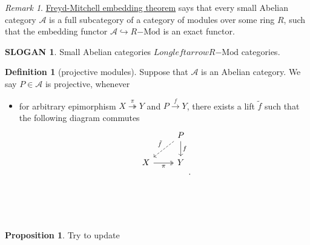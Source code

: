 \documentclass{MainStyle}
\theoremstyle{definition}
\theoremstyle{definition}
\newtheorem{slogan}{SLOGAN}
\theoremstyle{definition}
\newtheorem{definition}{Definition}
\theoremstyle{definition}
\newtheorem{proposition}{Proposition}
\theoremstyle{definition}
\theoremstyle{definition}
\theoremstyle{definition}
\theoremstyle{remark}
\newtheorem{remark}{Remark}
\theoremstyle{remark}
\begin{document}
\begin{remark}
    \href{https://ncatlab.org/nlab/show/Freyd-Mitchell+embedding+theorem}{Freyd-Mitchell embedding theorem} says that every small Abelian category $\mathcal A$ is a full subcategory of a category of modules over some ring $R$, such that the embedding functor $\mathcal A\hookrightarrow R\mathrm{-Mod}$ is an exact functor.
\end{remark}

\begin{slogan}
    Small Abelian categories $Longleftarrow R\mathrm{-Mod}$ categories.
\end{slogan}

\begin{definition}[projective modules]
    Suppose that $\mathcal A$ is an Abelian category. We say $P\in \mathcal A$ is projective, whenever
    \begin{itemize}
        \item for arbitrary epimorphism $X\overset \pi\twoheadrightarrow Y$ and $P\overset f\to Y$, there exists a lift $\tilde f$ such that the following diagram commutes
              \[\begin{tikzcd}
                      & P \\
                      X & Y \\
                      \\
                      \\
                      & {}
                      \arrow["\pi"', two heads, from=2-1, to=2-2]
                      \arrow["{\tilde f}"', dashed, from=1-2, to=2-1]
                      \arrow["f", from=1-2, to=2-2]
                  \end{tikzcd}.\]
    \end{itemize}
\end{definition}

\begin{proposition}
    Try to update
\end{proposition}
\end{document}

